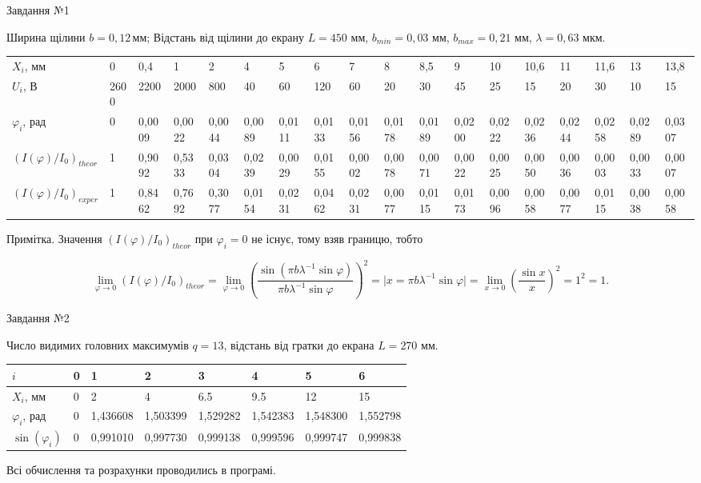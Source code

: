 \documentclass[12pt,a4paper]{article}
\begin{document}
    \setcounter{page}{5}
    \setlength{\parindent}{0pt}

    Завдання №1

    Ширина щілини $b=0{,}12\,$мм; Відстань від щілини до екрану $L = 450$ мм, $b_{min} = 0{,}03$ мм, $b_{max} = 0{,}21$ мм, $\lambda = 0{,}63$ мкм.

    \begin{table}[ht]
        \begin{tabular}{|l|*{17}{l}|}
        \hline
        $X_i$, мм 
            & 0 & 0,4 & 1 & 2 & 4 &
            5 & 6 & 7 & 8 & 8,5 &
            9 & 10 & 10,6 & 11 & 11,6 & 13 & 13,8 \\
        $U_i$, В
            & 2600 & 2200 & 2000 & 800 & 40 & 60 
            & 120 & 60 & 20 & 30 & 45 & 25 
            & 15 & 20 & 30 & 10 & 15 \\
        $\varphi_i$, рад
        & 0 & 0,0009 & 0,0022 & 0,0044 & 0,0089 & 0,0111 & 0,0133 & 0,0156 & 0,0178 & 0,0189 & 0,0200 & 0,0222
        & 0,0236 & 0,0244 & 0,0258 & 0,0289 & 0,0307 \\
        $\left( I(\varphi) \slash I_0 \right)_{theor}$
        & 1 & 0,9092 & 0,5333 & 0,0304 & 0,0239 & 0,0029 & 0,0155 & 0,0002 & 0,0078 & 0,0071 & 0,0022 & 0,0025
        & 0,0050 & 0,0036 & 0,0003 & 0,0033 & 0,0007 \\
        $\left( I(\varphi) \slash I_0 \right)_{exper}$
        & 1 & 0,8462 & 0,7692 & 0,3077 & 0,0154 & 0,0231 & 0,0462 & 0,0231 & 0,0077 & 0,0115 & 0,0173 & 0,0096
        & 0,0058 & 0,0077 & 0,0115 & 0,0038 & 0,0058 \\
        \hline
        \end{tabular}
    \end{table}

    Примітка. Значення $\left( I(\varphi) \slash I_0 \right)_{theor}$ при $\varphi_i = 0$ не існує, тому взяв границю, тобто

    \[
    \lim_{\varphi \rightarrow 0} \left( I(\varphi) \slash I_0 \right)_{theor} = \lim_{\varphi \rightarrow 0} \left( \frac{\sin(\pi b \lambda^{-1} \sin \varphi)}{\pi b \lambda^{-1} \sin \varphi} \right)^2=
    \Big| x = \pi b \lambda^{-1} \sin \varphi \Big| = \lim_{x \rightarrow 0} \left( \frac{\sin x}{x} \right)^2 = 1^2 = 1.
    \]

    Завдання №2

    Число видимих головних максимумів $q = 13$, відстань від гратки до екрана $L = 270$ мм.

    \begin{table}[ht]
        \begin{tabular}{|l|*{7}{l}|}
        \hline
        $i$
            & 0 & 1 & 2 & 3 & 4 & 5 & 6 \\
        \hline
        $X_i$, мм
            & 0 & 2 & 4 & 6.5 & 9.5 & 12 & 15 \\
        $\varphi_i$, рад
        & 0 & 1,436608 & 1,503399 & 1,529282 & 1,542383 & 1,548300
        & 1,552798 \\
        $\sin(\varphi_i)$
        & 0 & 0,991010 & 0,997730 & 0,999138 & 0,999596 & 0,999747 & 0,999838 \\
        \hline
        \end{tabular}
    \end{table}

    Всі обчислення та розрахунки проводились в програмі.
\end{document}
